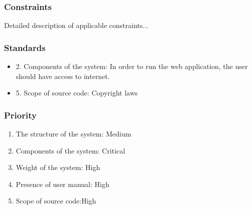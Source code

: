 \subsubsection{Constraints}
Detailed description of applicable constraints...
\subsubsection{Standards}
\begin{itemize}
    \item  2. Components of the system: In order to run the web application, the user should have access to internet.
   \item 5. Scope of source code: Copyright laws
\end{itemize}
 
\subsubsection{Priority}
\begin{enumerate}
  \item The structure of the system: Medium
  \item Components of the system: Critical
  \item Weight of the system: High
  \item Presence of user manual: High
  \item Scope of source code:High
\end{enumerate}
